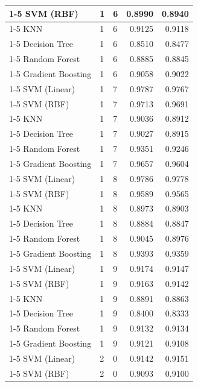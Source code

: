 \begin{table}
\begin{tabular}{lllrr}
\cline{1-5} \cline{2-5}
SVM (RBF) & 1 & 6 & 0.8990 & 0.8940 \\
\cline{1-5} \cline{2-5}
KNN & 1 & 6 & 0.9125 & 0.9118 \\
\cline{1-5} \cline{2-5}
Decision Tree & 1 & 6 & 0.8510 & 0.8477 \\
\cline{1-5} \cline{2-5}
Random Forest & 1 & 6 & 0.8885 & 0.8845 \\
\cline{1-5} \cline{2-5}
Gradient Boosting & 1 & 6 & 0.9058 & 0.9022 \\
\cline{1-5} \cline{2-5}
SVM (Linear) & 1 & 7 & 0.9787 & 0.9767 \\
\cline{1-5} \cline{2-5}
SVM (RBF) & 1 & 7 & 0.9713 & 0.9691 \\
\cline{1-5} \cline{2-5}
KNN & 1 & 7 & 0.9036 & 0.8912 \\
\cline{1-5} \cline{2-5}
Decision Tree & 1 & 7 & 0.9027 & 0.8915 \\
\cline{1-5} \cline{2-5}
Random Forest & 1 & 7 & 0.9351 & 0.9246 \\
\cline{1-5} \cline{2-5}
Gradient Boosting & 1 & 7 & 0.9657 & 0.9604 \\
\cline{1-5} \cline{2-5}
SVM (Linear) & 1 & 8 & 0.9786 & 0.9778 \\
\cline{1-5} \cline{2-5}
SVM (RBF) & 1 & 8 & 0.9589 & 0.9565 \\
\cline{1-5} \cline{2-5}
KNN & 1 & 8 & 0.8973 & 0.8903 \\
\cline{1-5} \cline{2-5}
Decision Tree & 1 & 8 & 0.8884 & 0.8847 \\
\cline{1-5} \cline{2-5}
Random Forest & 1 & 8 & 0.9045 & 0.8976 \\
\cline{1-5} \cline{2-5}
Gradient Boosting & 1 & 8 & 0.9393 & 0.9359 \\
\cline{1-5} \cline{2-5}
SVM (Linear) & 1 & 9 & 0.9174 & 0.9147 \\
\cline{1-5} \cline{2-5}
SVM (RBF) & 1 & 9 & 0.9163 & 0.9142 \\
\cline{1-5} \cline{2-5}
KNN & 1 & 9 & 0.8891 & 0.8863 \\
\cline{1-5} \cline{2-5}
Decision Tree & 1 & 9 & 0.8400 & 0.8333 \\
\cline{1-5} \cline{2-5}
Random Forest & 1 & 9 & 0.9132 & 0.9134 \\
\cline{1-5} \cline{2-5}
Gradient Boosting & 1 & 9 & 0.9121 & 0.9108 \\
\cline{1-5} \cline{2-5}
SVM (Linear) & 2 & 0 & 0.9142 & 0.9151 \\
\cline{1-5} \cline{2-5}
SVM (RBF) & 2 & 0 & 0.9093 & 0.9100 \\

\end{tabular}
\end{table}
